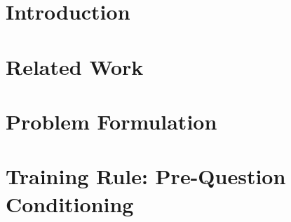 \documentclass[runningheads]{llncs}
\begin{document}
\begin{abstract}
Knowledge tracing (KT) predicts whether a student will answer the next question correctly. Many KT models expand a question with several knowledge components (KCs) into one training token per KC, each carrying the question's label. The pyKT benchmark trains this way but evaluates every KC from the history before the question. This mismatch lets the model read the label it must predict and learn to copy it from the second KC on. We propose Pre-Question Conditioning (PQC), a training rule rather than an architecture change: a question's label must not enter the state used to predict it, and all its KCs are predicted from the state before the question. On XES3G5M, standard DKT has an AUC 0.098 lower on the second and later KCs of multi-KC questions than on the first. PQC raises question-level AUC from 0.7841 to 0.7891 (+0.0050, all 15 runs) and lowers ECE from 0.0111 to 0.0047. Removing the label from the context gives +0.0045, reading the pre-question state a further +0.0011. The gain is concentrated in multi-KC questions (+0.032 AUC versus +0.001 on single-KC questions). Controls on DKT (shuffled labels, intervention test) support copying and show that PQC variants do not leak. On simpleKT, the same rule raises AUC from 0.8121 to 0.8164 (+0.0043, 5 of 5 folds) and removes the gap between first and later KCs, with indirect evidence for the mechanism. It lowers AUC on single-KC questions ($-$0.0027), mostly on immediate repeats, which our segment convention hides from the model.

\end{abstract}

\section{Introduction}


\section{Related Work}      
\section{Problem Formulation}   
\section{Training Rule: Pre-Question Conditioning}     
\end{document}
